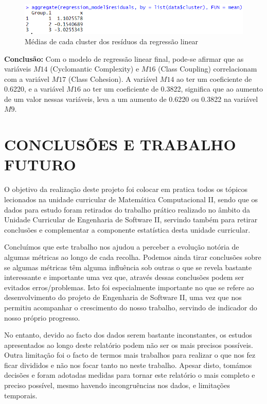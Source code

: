 \documentclass[%
 aip,
cp,  %
 amsmath,amssymb,%
 reprint,%
]{revtex4-2}
\begin{document}
\begin{figure}[!h]
    \centering
    \includegraphics[width=0.6\linewidth]{imagens//questao4/agregateMethod.png}
    \caption{Médias de cada cluster dos resíduos da regressão linear}
    \label{fig:mediaClusters}
\end{figure}

\vspace{1cm}

\textbf{Conclusão:} Com o modelo de regressão linear final, pode-se afirmar que as variáveis $M14$ (Cyclomantic Complexity) e $M16$ (Class Coupling) correlacionam com a variável $M17$ (Class Cohesion). A variável $M14$ ao ter um coeficiente de 0.6220, e a variável $M16$ ao ter um coeficiente de 0.3822, significa que ao aumento de um valor nessas variáveis, leva a um aumento de 0.6220 ou 0.3822 na variável $M9$.

\newpage

\section{CONCLUSÕES E TRABALHO FUTURO \label{sec:Conclusions}} 

O objetivo da realização deste projeto foi colocar em pratica todos os tópicos lecionados na unidade curricular de Matemática Computacional II, sendo que os dados para estudo foram retirados do trabalho prático realizado no âmbito da Unidade Curricular de Engenharia de Software II, servindo também para retirar conclusões e complementar a componente estatística desta unidade curricular.

Concluímos que este trabalho nos ajudou a perceber a evolução notória de algumas métricas ao longo de cada recolha. Podemos ainda tirar conclusões sobre se algumas métricas têm alguma influência sob outras o que se revela bastante interessante e importante uma vez que, através dessas conclusões podem ser evitados erros/problemas. Isto foi especialmente importante no que se refere ao desenvolvimento do projeto de Engenharia de Software II, uma vez que nos permitiu acompanhar o crescimento do nosso trabalho, servindo de indicador do nosso próprio progresso.

No entanto, devido ao facto dos dados serem bastante inconstantes, os estudos apresentados ao longo deste relatório podem não ser os mais precisos possíveis. Outra limitação foi o facto de termos mais trabalhos para realizar o que nos fez ficar divididos e não nos focar tanto no neste trabalho. Apesar disto, tomámos decisões e foram adotadas medidas para tornar este relatório o mais completo e preciso possível, mesmo havendo incongruências nos dados, e limitações temporais.
\end{document}
